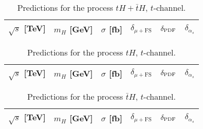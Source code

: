 \begin{table}
    \centering
    \begin{tabular}{cccccc}
        $\sqrt{s}$ [TeV]  &  $m_H$ [GeV]  &  $\sigma$ [fb]  & $\delta_{\mu+\textrm{FS}}$   &  $\delta_{\rm PDF}$   & $\delta_{\alpha_s}$\\
        \hline
          
    \end{tabular}
    \caption{\label{tab:th-t-tot} Predictions for the process $tH + \bar t H$, $t$-channel.}
\end{table}
%
\begin{table}
    \centering
    \begin{tabular}{cccccc}
        $\sqrt{s}$ [TeV]  &  $m_H$ [GeV]  &  $\sigma$ [fb]  & $\delta_{\mu+\textrm{FS}}$   &  $\delta_{\rm PDF}$   & $\delta_{\alpha_s}$\\
        \hline
          
    \end{tabular}
    \caption{\label{tab:th-t-top} Predictions for the process $tH$, $t$-channel.}
\end{table}
%
\begin{table}
    \centering
    \begin{tabular}{cccccc}
        $\sqrt{s}$ [TeV]  &  $m_H$ [GeV]  &  $\sigma$ [fb]  & $\delta_{\mu+\textrm{FS}}$   &  $\delta_{\rm PDF}$   & $\delta_{\alpha_s}$\\
        \hline
          
    \end{tabular}
    \caption{\label{tab:th-t-atop} Predictions for the process $\bar tH$, $t$-channel.}
\end{table}


